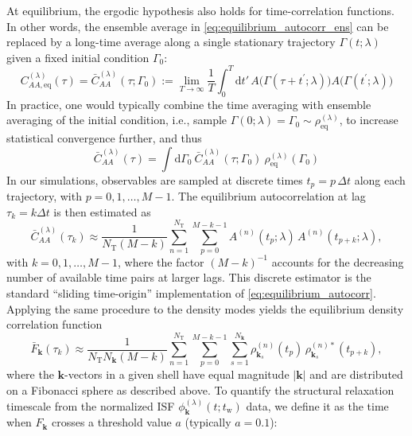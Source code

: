 At equilibrium, the ergodic hypothesis also holds for time-correlation functions. In other words, the ensemble average in \cref{eq:equilibrium_autocorr_ens} can be replaced by a long-time average along a single stationary trajectory $\Gamma(t;\lambda)$ given a fixed initial condition $\Gamma_0$:
\begin{equation}
C_{AA,\mathrm{eq}}^{(\lambda)}(\tau)
= \bar{C}_{AA}^{(\lambda)}(\tau;\Gamma_0) := \lim_{T \to \infty} \frac{1}{T} \int_0^T \mathrm{d}t'\,
A\bigl(\Gamma(\tau+t^\prime; \lambda) \bigr) A\bigl(\Gamma(t^\prime; \lambda) \bigr)
\label{eq:equilibrium_autocorr}
\end{equation}
In practice, one would typically combine the time averaging with ensemble averaging of the initial condition, i.e., sample $\Gamma(0;\lambda) = \Gamma_0  \sim \rho_{\mathrm{eq}}^{(\lambda)}$, to increase statistical convergence further, and thus
\begin{equation}
\bar{C}_{AA}^{(\lambda)}(\tau) = \int \mathrm{d} \Gamma_0 \ \bar{C}_{AA}^{(\lambda)}(\tau;\Gamma_0) \ \rho^{(\lambda)}_\mathrm{eq}(\Gamma_0)
\end{equation}
In our simulations, observables are sampled at discrete times $t_p = p\,\Delta t$ along each trajectory, with $p = 0,1,\ldots,M-1$. The equilibrium autocorrelation at lag $\tau_k = k \Delta t$ is then estimated as
\begin{equation}
\bar{C}_{AA}^{(\lambda)}(\tau_k)
\approx  \frac{1}{N_\mathrm{T}(M-k)} \sum_{n=1}^{N_\mathrm{T}} \sum_{p=0}^{M-k-1}
A^{(n)}(t_p;\lambda)\, A^{(n)}(t_{p+k};\lambda),
\end{equation}
with $k = 0, 1, \ldots, M-1$, where the factor $(M-k)^{-1}$ accounts for the decreasing number of available time pairs at larger lags. This discrete estimator is the standard “sliding time-origin” implementation of \cref{eq:equilibrium_autocorr}. %
Applying the same procedure to the density modes yields the equilibrium density correlation function
\begin{equation}
\bar{F}_{\bm k}(\tau_k)
\approx \frac{1}{N_\mathrm{T}N_{\bm k}(M-k)} \sum_{n=1}^{N_\mathrm{T}} \sum_{p=0}^{M-k-1}
\sum_{s=1}^{N_{\bm k}} \rho_{\bm k_s}^{(n)}(t_p)\, \rho_{\bm k_s}^{(n)*}(t_{p+k}) ,
\end{equation}
where the $\bm k$-vectors in a given shell have equal magnitude $|\bm k|$ and are distributed on a Fibonacci sphere as described above. To quantify the structural relaxation timescale from the normalized ISF $\phi_{\bm k}^{(\lambda)}(t;t_\mathrm{w})$ data, we define it as the time when $F_{\bm k}$ crosses a threshold value $a$ (typically $a = 0.1$):
